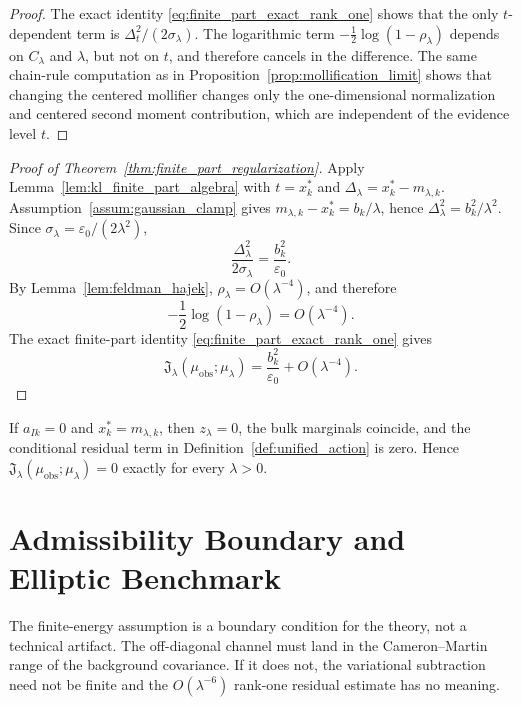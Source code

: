 \begin{proof}
The exact identity \eqref{eq:finite_part_exact_rank_one} shows that the only
$t$-dependent term is $\Delta_t^2/(2\sigma_\lambda)$.  The logarithmic term
$-\frac12\log(1-\rho_\lambda)$ depends on $C_\lambda$ and $\lambda$, but not on
$t$, and therefore cancels in the difference.  The same chain-rule computation
as in Proposition~\ref{prop:mollification_limit} shows that changing the centered
mollifier changes only the one-dimensional normalization and centered second
moment contribution, which are independent of the evidence level $t$.
\end{proof}

\begin{proof}[Proof of Theorem~\ref{thm:finite_part_regularization}]
Apply Lemma~\ref{lem:kl_finite_part_algebra} with $t=x_k^*$ and
$\Delta_\lambda=x_k^*-m_{\lambda,k}$.  Assumption~\ref{assum:gaussian_clamp}
gives $m_{\lambda,k}-x_k^*=b_k/\lambda$, hence
$\Delta_\lambda^2=b_k^2/\lambda^2$.  Since
$\sigma_\lambda=\varepsilon_0/(2\lambda^2)$,
\[
  \frac{\Delta_\lambda^2}{2\sigma_\lambda}
  =\frac{b_k^2}{\varepsilon_0}.
\]
By Lemma~\ref{lem:feldman_hajek}, $\rho_\lambda=O(\lambda^{-4})$, and therefore
\[
  -\frac12\log(1-\rho_\lambda)=O(\lambda^{-4}).
\]
The exact finite-part identity \eqref{eq:finite_part_exact_rank_one} gives
\[
  \mathfrak{J}_\lambda(\mu_{\mathrm{obs}};\mu_\lambda)
  =
  \frac{b_k^2}{\varepsilon_0}+O(\lambda^{-4}).
\]
\end{proof}

If $a_{Ik}=0$ and $x_k^*=m_{\lambda,k}$, then
$z_\lambda=0$, the bulk marginals coincide, and the conditional residual term
in Definition~\ref{def:unified_action} is zero.  Hence
$\mathfrak{J}_\lambda(\mu_{\mathrm{obs}};\mu_\lambda)=0$ exactly for every
$\lambda>0$.

\section{Admissibility Boundary and Elliptic Benchmark}
\label{app:admissibility_boundary}

The finite-energy assumption is a boundary condition for the theory, not a
technical artifact.  The off-diagonal channel must land in the Cameron--Martin
range of the background covariance.  If it does not, the variational subtraction
need not be finite and the $O(\lambda^{-6})$ rank-one residual estimate has no
meaning.

